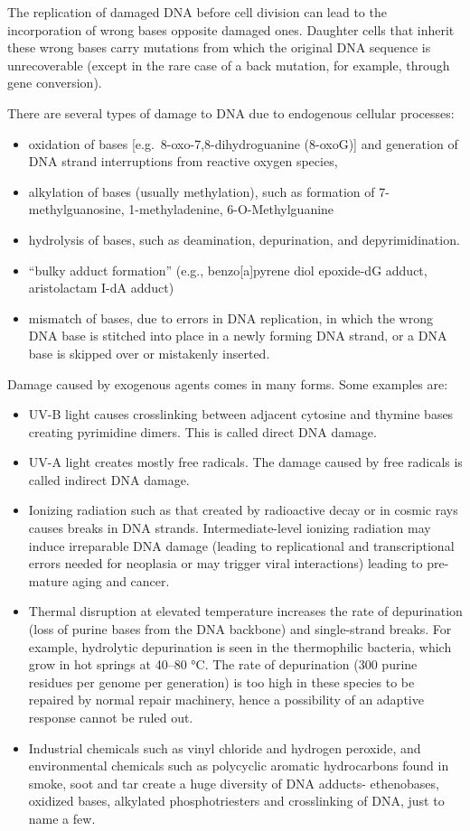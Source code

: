 The replication of damaged DNA before cell division can lead to the incorporation of wrong bases opposite damaged ones. Daughter cells that inherit these wrong bases carry mutations from which the original DNA sequence is unrecoverable (except in the rare case of a back mutation, for example, through gene conversion).

There are several types of damage to DNA due to endogenous cellular processes:

\begin{itemize}
\tightlist
\item
  oxidation of bases {[}e.g.~8-oxo-7,8-dihydroguanine (8-oxoG){]} and generation of DNA strand interruptions from reactive oxygen species,
\item
  alkylation of bases (usually methylation), such as formation of 7-methylguanosine, 1-methyladenine, 6-O-Methylguanine
\item
  hydrolysis of bases, such as deamination, depurination, and depyrimidination.
\item
  ``bulky adduct formation'' (e.g., benzo{[}a{]}pyrene diol epoxide-dG adduct, aristolactam I-dA adduct)
\item
  mismatch of bases, due to errors in DNA replication, in which the wrong DNA base is stitched into place in a newly forming DNA strand, or a DNA base is skipped over or mistakenly inserted.
\end{itemize}

Damage caused by exogenous agents comes in many forms. Some examples are:

\begin{itemize}
\tightlist
\item
  UV-B light causes crosslinking between adjacent cytosine and thymine bases creating pyrimidine dimers. This is called direct DNA damage.
\item
  UV-A light creates mostly free radicals. The damage caused by free radicals is called indirect DNA damage.
\item
  Ionizing radiation such as that created by radioactive decay or in cosmic rays causes breaks in DNA strands. Intermediate-level ionizing radiation may induce irreparable DNA damage (leading to replicational and transcriptional errors needed for neoplasia or may trigger viral interactions) leading to pre-mature aging and cancer.
\item
  Thermal disruption at elevated temperature increases the rate of depurination (loss of purine bases from the DNA backbone) and single-strand breaks. For example, hydrolytic depurination is seen in the thermophilic bacteria, which grow in hot springs at 40--80 °C. The rate of depurination (300 purine residues per genome per generation) is too high in these species to be repaired by normal repair machinery, hence a possibility of an adaptive response cannot be ruled out.
\item
  Industrial chemicals such as vinyl chloride and hydrogen peroxide, and environmental chemicals such as polycyclic aromatic hydrocarbons found in smoke, soot and tar create a huge diversity of DNA adducts- ethenobases, oxidized bases, alkylated phosphotriesters and crosslinking of DNA, just to name a few.
\end{itemize}

